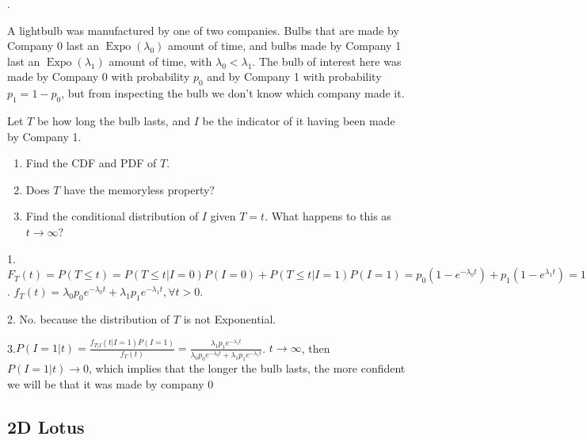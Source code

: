 \documentclass[8pt]{beamer}
\newcommand{\Expo}[1]{\operatorname{Expo}\!\left(#1\right)}
\begin{document}
\begin{frame}{.}
    \begin{example}
      A lightbulb was manufactured by one of two companies. 
      Bulbs that are made by Company 0 last an $\Expo{\lambda_0}$ amount of time, and bulbs made by Company 1 last an $\Expo{\lambda_1}$ amount of time, with $\lambda_0 < \lambda_1$. 
      The bulb of interest here was made by Company 0 with probability $p_0$ and by Company 1 with probability $p_1 = 1 - p_0$, but from inspecting the bulb we don't know which company made it.

      Let $T$ be how long the bulb lasts, and $I$ be the indicator of it having been made by Company 1.
      \begin{enumerate}
        \item Find the CDF and PDF of $T$.
        \item Does $T$ have the memoryless property?
        \item Find the conditional distribution of $I$ given $T=t$. What happens to this as $t \rightarrow \infty$?
      \end{enumerate}
    \end{example}
    1. $F_{T}(t) = P(T\leq t) = P(T\leq t|I=0)P(I=0) + P(T\leq t|I=1)P(I=1) = p_0 (1 - e^{-\lambda_0 t} )   + p_1 ( 1- e^{\lambda_1 t} ) = 1 - p_0 e^{-\lambda_0 t} - p_1 e^{-\lambda_1 t}, \forall t>0$. 
    $f_T(t) = \lambda_0 p_0 e^{-\lambda_0 t} + \lambda_1 p_1 e^{-\lambda_1 t}, \forall t>0$.

    2. No. because the distribution of $T$ is not Exponential.

    3.$P(I=1|t) = \frac{f_{T|I}(t|I=1) P(I=1)}{f_T(t)} = \frac{\lambda_1 p_1 e^{-\lambda_1 t}}{\lambda_0 p_0 e^{-\lambda_0 t} + \lambda_1 p_1 e^{-\lambda_1 t}}$. $t\rightarrow \infty$, then $P(I=1|t) \rightarrow 0$, which implies that the longer the bulb lasts, the more confident we will be that it was made by company 0
\end{frame}

\subsection{2D Lotus}
\end{document}
